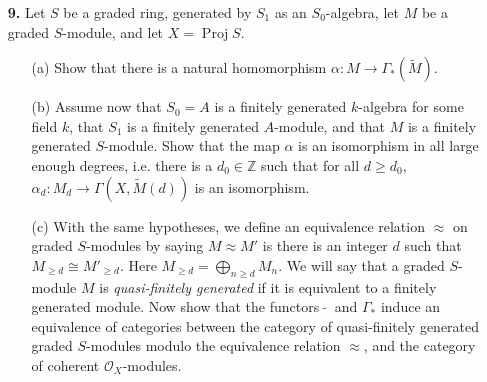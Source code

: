 \documentclass{article}
\newcommand{\goth}[1]{\textfrak{#1}}
\newcommand{\fF}{\mathcal{F}}
\newcommand{\fO}{\mathcal{O}}
\newcommand{\Z}{\mathbb{Z}}
\DeclareMathOperator{\proj}{Proj}
\DeclareMathOperator{\spec}{Spec}
\newcommand\restr[2]{{%
  \left.\kern-\nulldelimiterspace %
  #1 %
  \vphantom{\big|} %
  \right|_{#2} %
}}
\begin{document}
\begin{enumerate} [label=\textbf{\arabic*.}, leftmargin=0em]
\begin{proof}
\begin{itemize} [leftmargin=0cm]
        \item[(c)] Let $x \in X$, let $\spec{A}$ be an open affine neighborhood of $x$ for some noetherian reduced ring $A$, and let $\goth{p}$ be the prime ideal corresponding to $x \in \spec{A}$. Set $r = \varphi(x)$. By (5.4), there exists a finitely generated $A$-module $M$ such that $\restr{\fF}{\spec{A}} = \tilde{M}$. Let $m_1, \dots, m_r \in \fF_x \cong M_\goth{p}$ such that their image in $\fF_x \otimes_{\fO_x} k(x)$ form a $k(x)$-basis. By Nakayama's lemma, the $m_i$'s generate $M_\goth{p}$ over $A_\goth{p}$, so they generate $M_\goth{q}$ for all prime ideals $\goth{q} \subseteq \goth{p}$. Suppose $\sum_{i = 1}^r a_i m_i = 0$ for $a_i \in A_\goth{p}$. Since the image of the $m_i$ in $M_\goth{q} \otimes_{A_\goth{q}} k(\goth{q})$ for all $i = 1, \dots, r$ form a $k(\goth{q})$-basis, the images of $a_i$ in $k(\goth{q})$ must be zero for all $i$. This implies $a_i$ is contained in all prime ideals of $A_\goth{p}$. However, $A_\goth{p}$ is reduced, so $a_i = 0$. Hence, $m_i$ are linearly independent.
    \end{itemize}
\end{proof}

\item[\textbf{9.}] Let $S$ be a graded ring, generated by $S_1$ as an $S_0$-algebra, let $M$ be a graded $S$-module, and let $X = \proj{S}$.
\begin{itemize} [leftmargin=0cm]
    \item[(a)] Show that there is a natural homomorphism $\alpha : M \to \Gamma_*(\tilde{M})$.
    \item[(b)] Assume now that $S_0 = A$ is a finitely generated $k$-algebra for some field $k$, that $S_1$ is a finitely generated $A$-module, and that $M$ is a finitely generated $S$-module. Show that the map $\alpha$ is an isomorphism in all large enough degrees, i.e. there is a $d_0 \in \Z$ such that for all $d \geq d_0$, $\alpha_d : M_d \to \Gamma(X, \tilde{M}(d))$ is an isomorphism.
    \item[(c)] With the same hypotheses, we define an equivalence relation $\approx$ on graded $S$-modules by saying $M \approx M'$ is there is an integer $d$ such that $M_{\geq d} \cong M'_{\geq d}$. Here $M_{\geq d} = \bigoplus_{n \geq d} M_n$. We will say that a graded $S$-module $M$ is \textit{quasi-finitely generated} if it is equivalent to a finitely generated module. Now show that the functors $~\tilde{}~$ and $\Gamma_*$ induce an equivalence of categories between the category of quasi-finitely generated graded $S$-modules modulo the equivalence relation $\approx$, and the category of coherent $\fO_X$-modules.
\end{itemize}


\end{enumerate}
\end{document}
